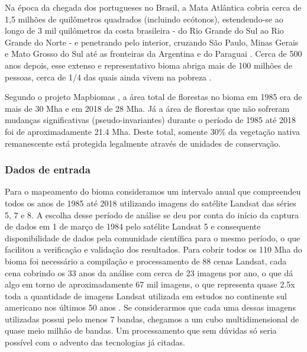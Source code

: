 Na época da chegada dos portugueses no Brasil, a Mata Atlântica cobria cerca de 1,5 milhões de quilômetros quadrados (incluindo ecótonos), estendendo-se ao longo de 3 mil quilômetros da costa brasileira - do Rio Grande do Sul ao Rio Grande do Norte - e penetrando pelo interior, cruzando São Paulo, Minas Gerais e Mato Grosso do Sul até as fronteiras da Argentina e do Paraguai \citep{scarano2014}. Cerca de 500 anos depois, esse extenso e representativo bioma abriga mais de 100 milhões de pessoas, cerca de 1/4 das quais ainda vivem na pobreza \citep{scarano2014}.

Segundo o projeto Mapbiomas \citep{Souza2019}, a área total de florestas no bioma em 1985 era de mais de 30 Mha e em 2018 de 28 Mha. Já a área de florestas que não sofreram mudanças significativas (pseudo-invariantes) durante o período de 1985 até 2018 foi de aproximadamente 21.4 Mha. Deste total, somente  30\% da vegetação nativa remanescente está protegida legalmente através de unidades de conservação.


\subsubsection{Dados de entrada}
\hspace{13pt} Para o mapeamento do bioma consideramos um intervalo anual que compreendeu todos os anos de 1985 até 2018 utilizando imagens do satélite Landsat das séries 5, 7 e 8. A escolha desse período de análise se deu por conta do início da captura de dados em 1 de março de 1984 pelo satélite Landsat 5 e consequente disponibilidade de dados pela comunidade científica para o mesmo período, o que facilitou a verificação e validação dos resultados. Para cobrir todos os 110 Mha do bioma foi necessário a compilação e processamento de 88 cenas Landsat, cada cena cobrindo os 33 anos da análise com cerca de 23 imagens por ano, o que dá algo em torno de aproximadamente 67 mil imagens, o que representa quase 2.5x toda a quantidade de imagens Landsat utilizada em estudos no continente sul americano nos últimos 50 anos \citep{Hemati2021}. Se considerarmos que cada uma dessas imagens utilizadas possui pelo menos 7 bandas, chegamos a um cubo multidimensional de quase meio milhão de bandas. Um processamento que sem dúvidas só seria possível com o advento das tecnologias já citadas.

